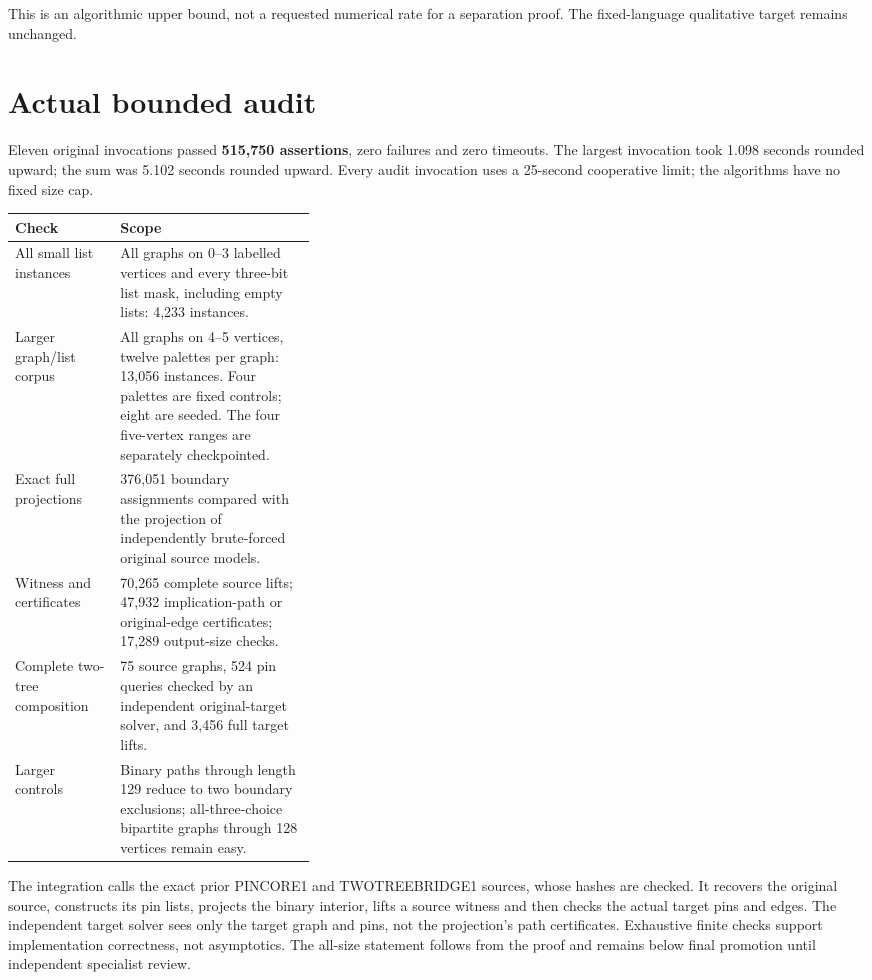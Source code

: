 \documentclass[11pt]{article}
\begin{document}
This is an algorithmic upper bound, not a requested numerical rate for a
separation proof. The fixed-language qualitative target remains unchanged.

\section{Actual bounded audit}
Eleven original invocations passed \textbf{515,750 assertions}, zero failures
and zero timeouts. The largest invocation took 1.098 seconds rounded upward;
the sum was 5.102 seconds rounded upward. Every audit invocation uses a
25-second cooperative limit; the algorithms have no fixed size cap.
\begin{center}\small
\begin{tabularx}{\linewidth}{p{0.35\linewidth}X}\toprule
Check & Scope\\\midrule
All small list instances & All graphs on 0--3 labelled vertices and every
three-bit list mask, including empty lists: 4,233 instances.\\
Larger graph/list corpus & All graphs on 4--5 vertices, twelve palettes per
graph: 13,056 instances. Four palettes are fixed controls; eight are seeded.
The four five-vertex ranges are separately checkpointed.\\
Exact full projections & 376,051 boundary assignments compared with the
projection of independently brute-forced original source models.\\
Witness and certificates & 70,265 complete source lifts; 47,932 implication-path
or original-edge certificates; 17,289 output-size checks.\\
Complete two-tree composition & 75 source graphs, 524 pin queries checked by
an independent original-target solver, and 3,456 full target lifts.\\
Larger controls & Binary paths through length 129 reduce to two boundary
exclusions; all-three-choice bipartite graphs through 128 vertices remain easy.\\\bottomrule
\end{tabularx}\end{center}
The integration calls the exact prior PINCORE1 and TWOTREEBRIDGE1 sources,
whose hashes are checked. It recovers the original source, constructs its
pin lists, projects the binary interior, lifts a source witness and then checks
the actual target pins and edges. The independent target solver sees only
the target graph and pins, not the projection's path certificates.
Exhaustive finite checks support implementation correctness, not asymptotics.
The all-size statement follows from the proof and remains below final promotion
until independent specialist review.
\end{document}
